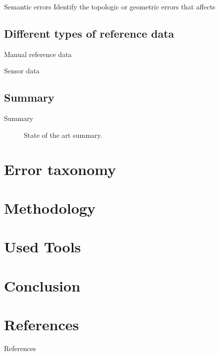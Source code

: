 \documentclass{beamer}
\begin{document}
            \begin{frame}{Semantic errors}
				Identify the topologic or geometric errors that affects 
            \end{frame}
        \subsection{Different types of reference data}
            \begin{frame}{Manual reference data}

            \end{frame}

            \begin{frame}{Sensor data}

            \end{frame}
        \subsection{Summary}
        	\begin{frame}[plain]{Summary}
        		\begin{figure}
        			
        			\caption{\label{fig::bib_summary} State of the art summary.}
        		\end{figure}
        	\end{frame}
    \section{Error taxonomy}
    \section{Methodology}
    \section{Used Tools}
    \section{Conclusion}

    \section*{References}
        \begin{frame}[allowframebreaks]{References}
            
            
        \end{frame}
\end{document}
